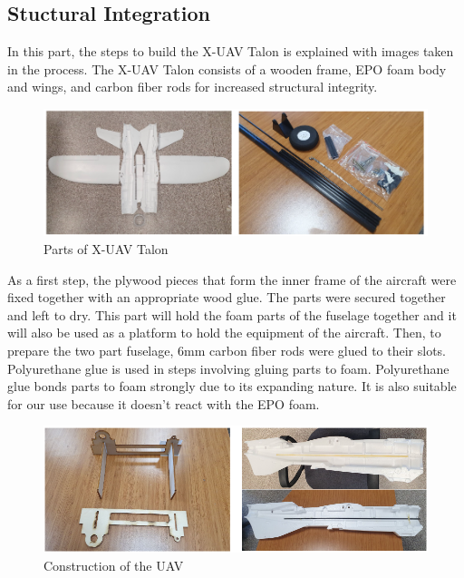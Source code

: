 \documentclass[12pt]{article}
\begin{document}
\subsection{Stuctural Integration}
In this part, the steps to build the X-UAV Talon is explained with images taken in the process. The X-UAV Talon consists of a wooden frame, EPO foam body and wings, and carbon fiber rods for increased structural integrity.

\begin{figure}[ht]
 	\centering
 	\includegraphics[width=\linewidth]{partsoftalon.png}
 	\caption{Parts of X-UAV Talon}
        \label{fig:in_veh_com}
 \end{figure}
\FloatBarrier

\justify
As a first step, the plywood pieces that form the inner frame of the aircraft were fixed together with an appropriate wood glue. The parts were secured together and left to dry. This part will hold the foam parts of the fuselage together and it will also be used as a platform to hold the equipment of the aircraft. Then, to prepare the two part fuselage, 6mm carbon fiber rods were glued to their slots. Polyurethane glue is used in steps involving gluing parts to foam. Polyurethane glue bonds parts to foam strongly due to its expanding nature. It is also suitable for our use because it doesn’t react with the EPO foam.
\begin{figure}[ht]
	\centering
	\includegraphics[width = \linewidth]{figures/constuction.png}
	\caption{Construction of the UAV}
       \label{fig:construction}
 \end{figure}
\FloatBarrier
\end{document}
